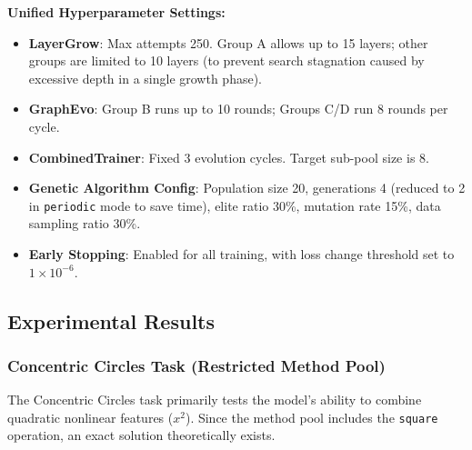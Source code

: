 \textbf{Unified Hyperparameter Settings:}
\begin{itemize}
    \item \textbf{LayerGrow}: Max attempts 250. Group A allows up to 15 layers; other groups are limited to 10 layers (to prevent search stagnation caused by excessive depth in a single growth phase).
    \item \textbf{GraphEvo}: Group B runs up to 10 rounds; Groups C/D run 8 rounds per cycle.
    \item \textbf{CombinedTrainer}: Fixed 3 evolution cycles. Target sub-pool size is 8.
    \item \textbf{Genetic Algorithm Config}: Population size 20, generations 4 (reduced to 2 in \texttt{periodic} mode to save time), elite ratio 30\%, mutation rate 15\%, data sampling ratio 30\%.
    \item \textbf{Early Stopping}: Enabled for all training, with loss change threshold set to $1 \times 10^{-6}$.
\end{itemize}

\subsection{Experimental Results}

\subsubsection*{Concentric Circles Task (Restricted Method Pool)}

The Concentric Circles task primarily tests the model's ability to combine quadratic nonlinear features ($x^2$). Since the method pool includes the \texttt{square} operation, an exact solution theoretically exists.

